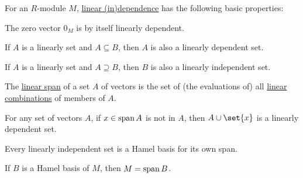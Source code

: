 \begin{proposition}\label{thm:def:module_linear_dependence/properties}
  For an \( R \)-module \( M \), \hyperref[def:module_linear_dependence]{linear (in)dependence} has the following basic properties:
  \begin{thmenum}
     The zero vector \( 0_M \) is by itself linearly dependent.

     If \( A \) is a linearly  set and \( A \subseteq B \), then \( A \) is also a linearly dependent set.

     If \( A \) is a linearly  set and \( A \supseteq B \), then \( B \) is also a linearly independent set.

     The \hyperref[def:semimodule/submodel]{linear span} of a set \( A \) of vectors is the set of (the evaluations of) all \hyperref[def:linear_combination]{linear combinations} of members of \( A \).

     For any set of vectors \( A \), if \( x \in \operatorname{span} A \) is not in \( A \), then \( A \cup \set{ x } \) is a linearly dependent set.

     Every linearly independent set is a Hamel basis for its own span.

     If \( B \) is a Hamel basis of \( M \), then \( M = \operatorname{span}{ B } \).
  \end{thmenum}
\end{proposition}
